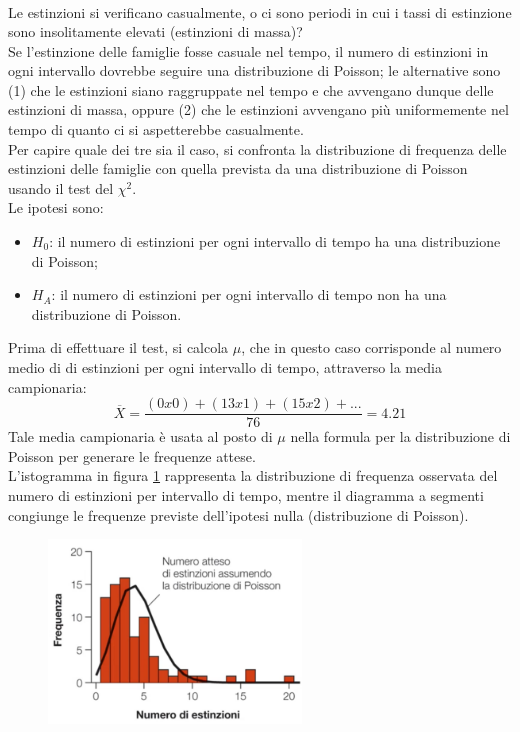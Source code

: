 \documentclass[10pt, draft]{book}
\newcommand{\tightlist}{%
\setlength{\itemsep}{1pt}\setlength{\parskip}{0pt}\setlength{\parsep}{0pt}}
\newcounter{example}[section]
\begin{document}
\begin{example}
\begin{table}[H]
\begin{tabular}{c|c}
        \hline
        \end{tabular}
        \caption{}
        \label{tabestinzioni}
\end{table}\noindent
Le estinzioni si verificano casualmente, o ci sono periodi in cui i tassi di estinzione sono insolitamente elevati (estinzioni di massa)?
\\
Se l'estinzione delle famiglie fosse casuale nel tempo, il numero di estinzioni in ogni intervallo dovrebbe seguire una distribuzione di Poisson; le alternative sono (1) che le estinzioni siano raggruppate nel tempo e che avvengano dunque delle estinzioni di massa, oppure (2) che le estinzioni avvengano più uniformemente nel tempo di quanto ci si aspetterebbe casualmente.
\\
Per capire quale dei tre sia il caso, si confronta la distribuzione di frequenza delle estinzioni delle famiglie con quella prevista da una distribuzione di Poisson usando il test del $\chi^2$.
\\
Le ipotesi sono:
\begin{itemize} \tightlist
    \item $H_0$: il numero di estinzioni per ogni intervallo di tempo ha una distribuzione di Poisson;
    \item $H_A$: il numero di estinzioni per ogni intervallo di tempo non ha una distribuzione di Poisson.
\end{itemize}
Prima di effettuare il test, si calcola $\mu$, che in questo caso corrisponde al numero medio di di estinzioni per ogni intervallo di tempo, attraverso la media campionaria:
\begin{equation}
\overline{X} = \frac{(0x0)+(13x1)+(15x2)+...}{76} = 4.21
\end{equation}
Tale media campionaria è usata al posto di $\mu$ nella formula per la distribuzione di Poisson per generare le frequenze attese.
\\
L'istogramma in figura \ref{fig8.6-2} rappresenta la distribuzione di frequenza osservata del numero di estinzioni per intervallo di tempo, mentre il diagramma a segmenti congiunge le frequenze previste dell'ipotesi nulla (distribuzione di Poisson).
    \begin{figure}[H]\label{fig8.6-2}
    \centering
    \includegraphics[width=0.6\textwidth]{fig8.6-2}

\end{figure}
\end{example}
\end{document}
